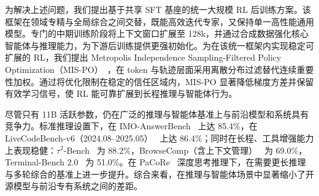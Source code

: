 为解决上述问题，我们提出基于共享 SFT 基座的统一大规模 RL 后训练方案。该框架在领域专精与全局综合之间交替，既能高效迭代专家，又保持单一高性能通用模型。专门的中期训练阶段将上下文窗口扩展至 128k，并通过合成数据强化核心智能体与推理能力，为下游后训练提供更强初始化。为在该统一框架内实现稳定可扩展的 RL，我们提出 Metropolis Independence Sampling-Filtered Policy Optimization（MIS-PO）~\cite{metropolis1953equation,hastings1970monte}，在 token 与轨迹层面采用离散分布过滤替代连续重要性加权。通过将优化限制在稳定的信任区域内，MIS-PO 显著降低梯度方差并保留有效学习信号，使 RL 能可靠扩展到长程推理与智能体行为。

尽管只有 11B 活跃参数，\ourmodel 仍在广泛的推理与智能体基准上与前沿模型和系统具有竞争力。标准推理设置下，在 IMO-AnswerBench~\cite{luong2025robustmathematicalreasoning} 上达 85.4\%，在 LiveCodeBench-v6（2024.08–2025.05）~\cite{jain2024livecodebench} 上达 86.4\%；同时在长程、工具增强能力上表现稳健：$\tau^2$-Bench~\cite{tau2bench2025} 为 88.2\%，BrowseComp（含上下文管理）~\cite{wei2025browsecomp} 为 69.0\%，Terminal-Bench 2.0~\cite{terminalbench2025} 为 51.0\%。在 PaCoRe~\cite{hu2026pacorelearningscaletesttime} 深度思考推理下，\ourmodel 在需要更长推理与多轮综合的基准上进一步提升。综合来看，\ourmodel 在推理与智能体场景中显著缩小了开源模型与前沿专有系统之间的差距。